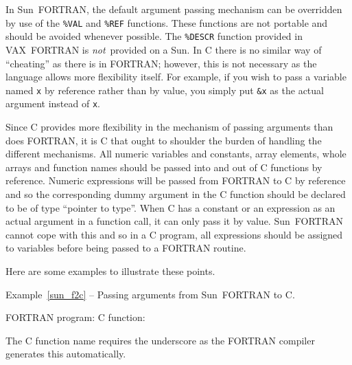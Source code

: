 \documentclass[twoside,11pt]{article}
\newcommand{\latex}[1]{#1}
\renewcommand{\_}{\texttt{\symbol{95}}}
\newcounter{examples}
\begin{document}
In Sun~FORTRAN, the default argument passing mechanism can be overridden by use
of the \texttt{\%VAL} and \texttt{\%REF} functions. These functions are not portable
and should be avoided whenever possible. The \texttt{\%DESCR} function provided in
VAX~FORTRAN is \textit{not}\, provided on a Sun. In C there is no similar way of
``cheating'' as there is in FORTRAN; however, this is not necessary as the
language allows more flexibility itself. For example, if you wish to pass a
variable named \texttt{x} by reference rather than by value, you simply put 
\texttt{\&x} as the actual argument instead of \texttt{x}. 

Since C provides more flexibility in the mechanism of passing arguments than
does FORTRAN, it is C that ought to shoulder the burden of handling the
different mechanisms. All numeric variables and constants, array elements,
whole arrays and function names should be passed into and out of C functions by
reference. Numeric expressions will be passed from FORTRAN to C by reference
and so the corresponding dummy argument in the C function should be declared to
be of type ``pointer to type''. When C has a constant or an expression as an
actual argument in a function call, it can only pass it by value. Sun~FORTRAN
cannot cope with this and so in a C program, all expressions should be assigned
to variables before being passed to a FORTRAN routine.

Here are some examples to illustrate these points. 

\label{sun_f2c}
\begin{center}
Example\latex{~\ref{sun_f2c}}
-- Passing arguments from Sun~FORTRAN to C\@.
\end{center}
\nopagebreak[4]
FORTRAN program:
\pagebreak[1]
C function:

The C function name requires the underscore as the FORTRAN compiler generates
this automatically. 
\end{document}
